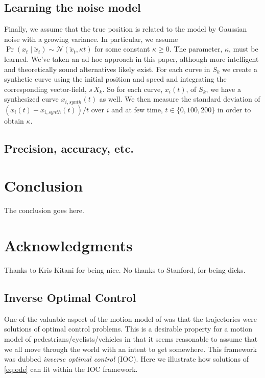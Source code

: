 \documentclass[conference]{IEEEtran}
\begin{document}
  \subsection{Learning the noise model}
  Finally, we assume that the true position is related to the model by Gaussian noise with a growing variance.
  In particular, we assume $\Pr( x_t \mid \check{x}_t) \sim \mathcal{N}( \check{x}_t , \kappa t)$ for some constant $\kappa \geq 0$.
  The parameter, $\kappa$, must be learned.
  We've taken an ad hoc approach in this paper, although more intelligent and theoretically sound alternatives likely exist.
  For each curve in $S_k$ we create a synthetic curve using the initial position and speed and integrating the corresponding vector-field, $s\, X_k$.
  So for each curve, $x_i(t)$, of $S_k$, we have a synthesized curve $x_{i,synth}(t)$ as well.
  We then measure the standard deviation of $(x_i(t) - x_{i,synth}(t)) / t$ over $i$ and at few time, $t \in \{ 0, 100, 200 \}$ in order to obtain $\kappa$.
  
 \subsection{ Precision, accuracy, etc.}



\section{Conclusion} 
\label{sec:conclusion}

The conclusion goes here.

\section*{Acknowledgments}
Thanks to Kris Kitani for being nice.  No thanks to Stanford, for being dicks.

\appendix
\subsection{Inverse Optimal Control} \label{app:ioc}
One of the valuable aspect of the motion model of \cite{Kitani2012} was that the trajectories were solutions of optimal control problems.
This is a desirable property for a motion model of pedestrians/cyclists/vehicles in that it seems reasonable to assume that we all move through the world with an intent to get somewhere.
This framework was dubbed \emph{inverse optimal control} (IOC).
Here we illustrate how solutions of \eqref{eq:ode} can fit within the IOC framework.
\end{document}
